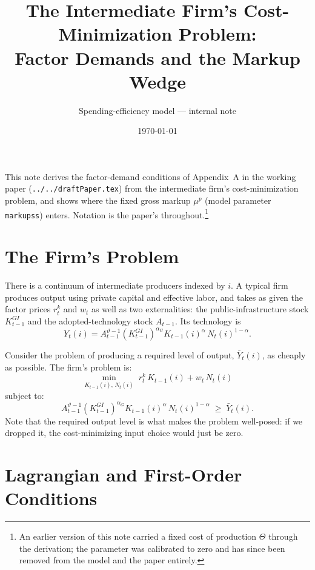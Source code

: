 \documentclass[11pt]{article}
\title{The Intermediate Firm's Cost-Minimization Problem:\\ Factor Demands and the Markup Wedge}
\author{Spending-efficiency model --- internal note}
\date{\today}
\begin{document}
\maketitle

\noindent
This note derives the factor-demand conditions of Appendix~A in the working paper
(\texttt{../../draftPaper.tex}) from the intermediate firm's cost-minimization
problem, and shows where the fixed gross markup $\mu^{p}$ (model parameter
\texttt{markupss}) enters. Notation is the paper's throughout.\footnote{An earlier
version of this note carried a fixed cost of production $\Theta$ through the
derivation; the parameter was calibrated to zero and has since been removed from
the model and the paper entirely.}

\section{The Firm's Problem}

There is a continuum of intermediate producers indexed by $i$. A typical firm
produces output using private capital and effective labor, and takes as given the
factor prices $r_t^{k}$ and $w_t$ as well as two externalities: the
public-infrastructure stock $K_{t-1}^{GI}$ and the adopted-technology stock
$A_{t-1}$. Its technology is
\begin{equation}\label{eq:tech}
    Y_t(i) = A_{t-1}^{\vartheta-1}\left(K_{t-1}^{GI}\right)^{\alpha_G}
    K_{t-1}(i)^{\alpha}\,N_t(i)^{1-\alpha}.
\end{equation}

Consider the problem of producing a required level of output, $\bar{Y}_t(i)$, as
cheaply as possible. The firm's problem is:
\begin{equation}\label{eq:problem}
    \min_{K_{t-1}(i),\,N_t(i)} \; r_t^{k}\,K_{t-1}(i) + w_t\,N_t(i)
\end{equation}
subject to:
\begin{equation}\label{eq:constraint}
    A_{t-1}^{\vartheta-1}\left(K_{t-1}^{GI}\right)^{\alpha_G}
    K_{t-1}(i)^{\alpha}\,N_t(i)^{1-\alpha} \;\ge\; \bar{Y}_t(i).
\end{equation}
Note that the required output level is what makes the problem well-posed: if we
dropped it, the cost-minimizing input choice would just be zero.

\section{Lagrangian and First-Order Conditions}
\end{document}
